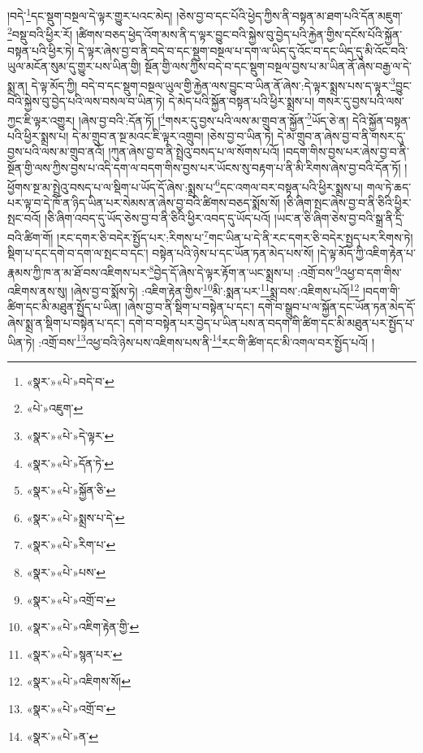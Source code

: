 །བདེ་\footnote{«སྣར་»«པེ་»བདེ་བ་}དང་སྡུག་བསྔལ་དེ་ལྟར་གྱུར་པའང་མེད། །ཅེས་བྱ་བ་དང་པོའི་ཕྱེད་ཀྱིས་ནི་བསྟན་མ་ཐག་པའི་དོན་མཇུག་\footnote{«པེ་»འཇུག་}བསྡུ་བའི་ཕྱིར་རོ། །ཚིགས་བཅད་ཕྱེད་འོག་མས་ནི་ད་ལྟར་བྱུང་བའི་སྐྱེས་བུ་བྱེད་པའི་རྐྱེན་གྱིས་དངོས་པོའི་སྐྱོན་བསྟན་པའི་ཕྱིར་ཏེ། དེ་ལྟར་ཞེས་བྱ་བ་ནི་བདེ་བ་དང་སྡུག་བསྔལ་པ་དག་ལ་ཡིད་དུ་འོང་བ་དང་ཡིད་དུ་མི་འོང་བའི་ཡུལ་མངོན་སུམ་དུ་གྱུར་པས་ཡིན་གྱི། སྔོན་གྱི་ལས་ཀྱིས་བདེ་བ་དང་སྡུག་བསྔལ་བྱས་པ་མ་ཡིན་ནོ་ཞེས་བརྒྱ་ལ་དེ་སྨྲ་ན། དེ་ལྟ་མོད་ཀྱི། བདེ་བ་དང་སྡུག་བསྔལ་ཡུལ་གྱི་རྐྱེན་ལས་བྱུང་བ་ཡིན་ནོ་ཞེས་:དེ་ལྟར་སྨྲས་པས་ད་ལྟར་\footnote{«སྣར་»«པེ་»དེ་ལྟར་}བྱུང་བའི་སྐྱེས་བུ་བྱེད་པའི་ལས་བསལ་བ་ཡིན་ཏེ། དེ་མེད་པའི་སྐྱོན་བསྟན་པའི་ཕྱིར་སྨྲས་པ། གསར་དུ་བྱས་པའི་ལས་ཀྱང་ཇི་ལྟར་འགྱུར། །ཞེས་བྱ་བའི་:དོན་ཏོ། །\footnote{«སྣར་»«པེ་»དོན་ཏེ་}གསར་དུ་བྱས་པའི་ལས་མ་གྲུབ་ན་སྐྱོན་\footnote{«སྣར་»«པེ་»སྐྱོན་ཅི་}ཡོད་ཅེ་ན། དེའི་སྐྱོན་བསྟན་པའི་ཕྱིར་སྨྲས་པ། དེ་མ་གྲུབ་ན་སྔ་མའང་ཇི་ལྟར་འགྲུབ། །ཅེས་བྱ་བ་ཡིན་ཏེ། དེ་མ་གྲུབ་ན་ཞེས་བྱ་བ་ནི་གསར་དུ་བྱས་པའི་ལས་མ་གྲུབ་ནའོ། །ཀུན་ཞེས་བྱ་བ་ནི་སྤྲེའུ་བསད་པ་ལ་སོགས་པའོ། །བདག་གིས་བྱས་པར་ཞེས་བྱ་བ་ནི་སྔོན་གྱི་ལས་ཀྱིས་བྱས་པ་འདི་དག་ལ་བདག་གིས་བྱས་པར་ཡོངས་སུ་བརྟག་པ་ནི་མི་རིགས་ཞེས་བྱ་བའི་དོན་ཏོ། །ཕྱོགས་སྔ་མ་སྤྲེའུ་བསད་པ་ལ་སྡིག་པ་ཡོད་དོ་ཞེས་:སྨྲས་པ་\footnote{«སྣར་»«པེ་»སྨྲས་པ་དེ་}དང་འགལ་བར་བསྟན་པའི་ཕྱིར་སྨྲས་པ། གལ་ཏེ་ཆད་པར་ལྟ་བ་དེ་ཁོ་ན་ཉིད་ཡིན་པར་སེམས་ན་ཞེས་བྱ་བའི་ཚིགས་བཅད་སྨོས་སོ། །ཅི་ཞིག་སྤང་ཞེས་བྱ་བ་ནི་ཅིའི་ཕྱིར་སྤང་བའོ། །ཅི་ཞིག་འབད་དུ་ཡོད་ཅེས་བྱ་བ་ནི་ཅིའི་ཕྱིར་འབད་དུ་ཡོད་པའོ། །ཡང་ན་ཅི་ཞིག་ཅེས་བྱ་བའི་སྒྲ་ནི་དྲི་བའི་ཚིག་གོ། །རང་དགར་ཅི་བདེར་སྤྱོད་པར་:རིགས་པ་\footnote{«སྣར་»«པེ་»རིག་པ་}གང་ཡིན་པ་དེ་ནི་རང་དགར་ཅི་བདེར་སྤྱད་པར་རིགས་ཏེ། སྡིག་པ་དང་དགེ་བ་དག་ལ་སྤང་བ་དང་། བསྟེན་པའི་ཉེས་པ་དང་ཡོན་ཏན་མེད་པས་སོ། །དེ་ལྟ་མོད་ཀྱི་འཇིག་རྟེན་པ་རྣམས་ཀྱི་ཁ་ན་མ་ཐོ་བས་འཇིགས་པར་\footnote{«སྣར་»«པེ་»པས་}བྱེད་དོ་ཞེས་དེ་ལྟར་རྟོག་ན་ཡང་སྨྲས་པ། :འགྲོ་བས་\footnote{«སྣར་»«པེ་»འགྲོ་བ་}འཕྱ་བ་དག་གིས་འཇིགས་ནས་སུ། །ཞེས་བྱ་བ་སྨོས་ཏེ། :འཇིག་རྟེན་གྱིས་\footnote{«སྣར་»«པེ་»འཇིག་རྟེན་གྱི་}མི་:སྨན་པར་\footnote{«སྣར་»«པེ་»སྙན་པར་}སྨྲ་བས་:འཇིགས་པའོ།\footnote{«སྣར་»«པེ་»འཇིགས་སོ།} །བདག་གི་ཚིག་དང་མི་མཐུན་སྤྱོད་པ་ཡིན། །ཞེས་བྱ་བ་ནི་སྡིག་པ་བསྟེན་པ་དང་། དགེ་བ་སྒྲུབ་པ་ལ་སྐྱོན་དང་ཡོན་ཏན་མེད་དོ་ཞེས་སྨྲ་ན་སྡིག་པ་བསྟེན་པ་དང་། དགེ་བ་བསྟེན་པར་བྱེད་པ་ཡིན་པས་ན་བདག་གི་ཚིག་དང་མི་མཐུན་པར་སྤྱོད་པ་ཡིན་ཏེ། :འགྲོ་བས་\footnote{«སྣར་»«པེ་»འགྲོ་བ་}འཕྱ་བའི་ཉེས་པས་འཇིགས་པས་ནི་\footnote{«སྣར་»«པེ་»ན་}རང་གི་ཚིག་དང་མི་འགལ་བར་སྤྱོད་པའོ། །
